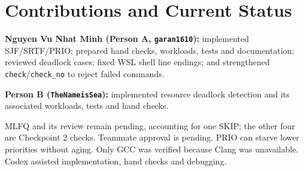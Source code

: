 \documentclass[11pt,a4paper]{article}
\newcommand{\code}[1]{\texttt{#1}}
\begin{document}
\section{Contributions and Current Status}

\textbf{Nguyen Vu Nhat Minh (Person A, \code{garan1610}):}
implemented SJF/SRTF/PRIO; prepared hand checks, workloads, tests and
documentation; reviewed deadlock cases; fixed WSL shell line endings;
and strengthened \code{check}/\code{check\_no} to reject failed commands.

\textbf{Person B (\code{TheNameisSea}):}
implemented resource deadlock detection and its associated workloads,
tests and hand checks.

MLFQ and its review remain pending, accounting for one SKIP; the other
four are Checkpoint 2 checks. Teammate approval is pending. PRIO can
starve lower priorities without aging. Only GCC was verified because
Clang was unavailable. Codex assisted implementation, hand checks and
debugging.
\end{document}
